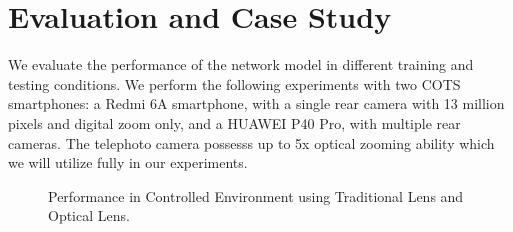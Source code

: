 \section{Evaluation and Case Study}
\label{sec-evaluation}
We evaluate the performance of the network model in different training and testing conditions. We perform the following experiments with two COTS smartphones: a Redmi 6A smartphone, with a single rear camera with 13 million pixels and digital zoom only, and a HUAWEI P40 Pro, with multiple rear cameras. The telephoto camera possesss up to 5x optical zooming ability which we will utilize fully in our experiments.
 
\begin{figure}[!t]
    \centering
    \hfill
    \caption{Performance in Controlled Environment using Traditional Lens and Optical Lens.}
    \label{fig:control}
\end{figure}
 
